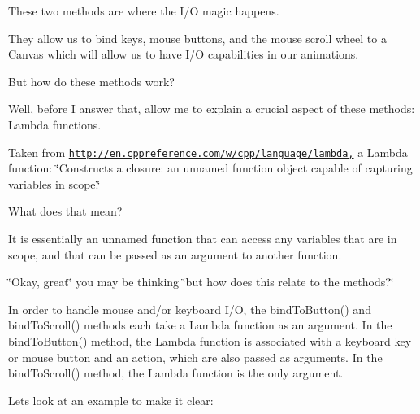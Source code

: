 These two methods are where the I/\+O magic happens.

They allow us to bind keys, mouse buttons, and the mouse scroll wheel to a Canvas which will allow us to have I/\+O capabilities in our animations.

But how do these methods work?

Well, before I answer that, allow me to explain a crucial aspect of these methods\+: Lambda functions.

Taken from \href{http://en.cppreference.com/w/cpp/language/lambda,}{\tt http\+://en.\+cppreference.\+com/w/cpp/language/lambda,} a Lambda function\+: \char`\"{}\+Constructs a closure\+: an unnamed function object capable of capturing variables in scope.\char`\"{}

What does that mean?

It is essentially an unnamed function that can access any variables that are in scope, and that can be passed as an argument to another function.

\char`\"{}\+Okay, great\char`\"{} you may be thinking \char`\"{}but how does this relate to the methods?\char`\"{}

In order to handle mouse and/or keyboard I/\+O, the bind\+To\+Button() and bind\+To\+Scroll() methods each take a Lambda function as an argument. In the bind\+To\+Button() method, the Lambda function is associated with a keyboard key or mouse button and an action, which are also passed as arguments. In the bind\+To\+Scroll() method, the Lambda function is the only argument.

Let\textquotesingle{}s look at an example to make it clear\+:


